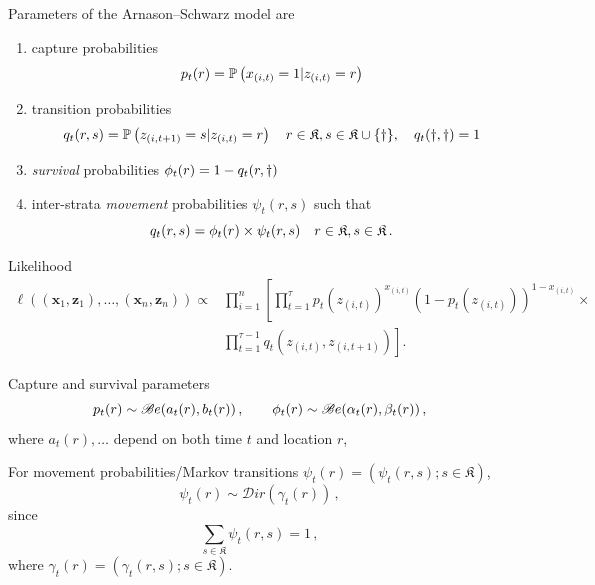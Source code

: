 \begin{slide}
\end{slide}\begin{slide}

Parameters of the Arnason--Schwarz model are 
\begin{enumerate}
\item capture probabilities $${p_t(r)}=\mathbb{P}\left(x_{(i,t)}=1|z_{(i,t)}=r\right)$$ 
\item transition probabilities
\small$$ {q_t(r,s)}=\mathbb{P}\left(z_{(i,t+1)}=s|z_{(i,t)}=r\right) 
\quad r\in \mathfrak{K}, s\in \mathfrak{K}\cup\{\dag\}, \quad q_t(\dag,\dag)=1
$$\normalsize
\item {\em survival} probabilities ${{\phi}_t(r)} = 1 - q_t(r,\dag)$ 
\item inter-strata {\em movement} probabilities $\psi_t(r,s)$  such that
$$
{q_t(r,s)}= {{\phi}_t(r)} \times \psi_t(r,s) \quad r \in \mathfrak{K}, s \in \mathfrak{K} \,.
$$
\end{enumerate}

\end{slide}\begin{slide}

Likelihood 
\small
\begin{align*}
 \ell(({\mathbf x}_1,{\mathbf z}_1),\ldots,({\mathbf x}_n,{\mathbf z}_n)) \propto &
 \prod_{i=1}^n\left[\prod_{t=1}^{\tau}p_t(z_{(i,t)})^{x_{(i,t)}}(1-p_t(z_{(i,t)}))^{1-x_{(i,t)}}\times\right. \nonumber\\
  &\left.\prod_{t=1}^{\tau-1}%
q_t(z_{(i,t)},z_{(i,t+1)})\right].\label{eq:ASchwz}
\end{align*}
\normalsize

\end{slide}\begin{slide}

Capture and survival parameters
$$
{p_t(r)} \sim \mathscr{B}e (a_t(r),b_t(r))\,, \qquad
{{\phi}_t(r)} \sim \mathscr{B}e (\alpha_t(r),\beta_t(r))\,, 
$$
where $a_t(r),\ldots$ depend on both time $t$ and location $r$,

\pause
For  movement probabilities/Markov transitions 
$\psi_t(r) = (\psi_t(r,s); s\in\mathfrak{K})$,
$$
\psi_t(r) \sim \mathscr{D}ir (\gamma_t(r))\,,
$$
since
$$\sum_{s\in\mathfrak{K}} \psi_t(r,s)=1\,,$$
where $\gamma_t(r)= (\gamma_t(r,s); s\in\mathfrak{K})$.

\end{slide}\begin{slide}


\end{slide}
